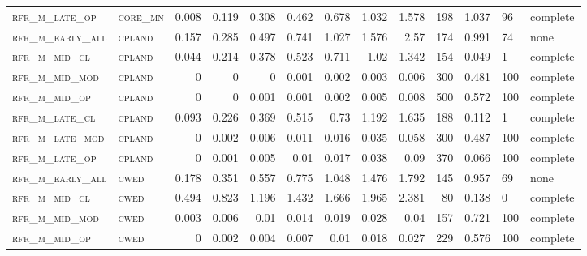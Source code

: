 \begin{landscape}
\begin{center}
\begin{longtable}{llrrrrr|rrr}
\textsc{rfr\_m\_late\_op  } & \textsc{core\_mn  }   & 0.008   & 0.119   & 0.308   & 0.462    & 0.678    & 1.032    & 1.578    & 198    & 1.037         & 96            & complete       \\
\textsc{rfr\_m\_early\_all} & \textsc{cpland    }   & 0.157   & 0.285   & 0.497   & 0.741    & 1.027    & 1.576    & 2.57     & 174    & 0.991         & 74            & none       \\
\textsc{rfr\_m\_mid\_cl   } & \textsc{cpland    }   & 0.044   & 0.214   & 0.378   & 0.523    & 0.711    & 1.02     & 1.342    & 154    & 0.049         & 1             & complete       \\
\textsc{rfr\_m\_mid\_mod  } & \textsc{cpland    }   & 0       & 0       & 0       & 0.001    & 0.002    & 0.003    & 0.006    & 300    & 0.481         & 100           & complete       \\
\textsc{rfr\_m\_mid\_op   } & \textsc{cpland    }   & 0       & 0       & 0.001   & 0.001    & 0.002    & 0.005    & 0.008    & 500    & 0.572         & 100           & complete       \\
\textsc{rfr\_m\_late\_cl  } & \textsc{cpland    }   & 0.093   & 0.226   & 0.369   & 0.515    & 0.73     & 1.192    & 1.635    & 188    & 0.112         & 1             & complete       \\
\textsc{rfr\_m\_late\_mod } & \textsc{cpland    }   & 0       & 0.002   & 0.006   & 0.011    & 0.016    & 0.035    & 0.058    & 300    & 0.487         & 100           & complete       \\
\textsc{rfr\_m\_late\_op  } & \textsc{cpland    }   & 0       & 0.001   & 0.005   & 0.01     & 0.017    & 0.038    & 0.09     & 370    & 0.066         & 100           & complete       \\
\textsc{rfr\_m\_early\_all} & \textsc{cwed      }   & 0.178   & 0.351   & 0.557   & 0.775    & 1.048    & 1.476    & 1.792    & 145    & 0.957         & 69            & none       \\
\textsc{rfr\_m\_mid\_cl   } & \textsc{cwed      }   & 0.494   & 0.823   & 1.196   & 1.432    & 1.666    & 1.965    & 2.381    & 80     & 0.138         & 0             & complete           \\
\textsc{rfr\_m\_mid\_mod  } & \textsc{cwed      }   & 0.003   & 0.006   & 0.01    & 0.014    & 0.019    & 0.028    & 0.04     & 157    & 0.721         & 100           & complete       \\
\textsc{rfr\_m\_mid\_op   } & \textsc{cwed      }   & 0       & 0.002   & 0.004   & 0.007    & 0.01     & 0.018    & 0.027    & 229    & 0.576         & 100           & complete       \\

\end{longtable}
\end{center}
\end{landscape}
